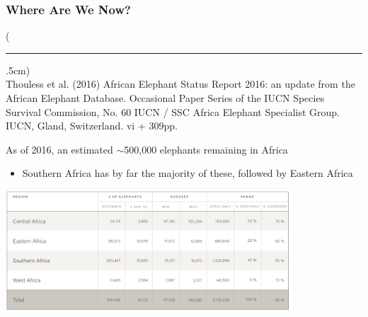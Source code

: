\documentclass[10pt]{beamer}
\newenvironment{reference}[2]{%
	\begin{textblock*}{\textwidth}(#1,#2)
		\tiny\bgroup\color{gray}}{\egroup\end{textblock*}}
\begin{document}
\begin{frame}[t]
\frametitle{Where Are We Now?}
\vspace{0.5cm}

	\begin{reference}{4mm}{88mm}
		\rule{1.5cm}{0.25pt}\\
		Thouless et al. (2016) African Elephant Status Report 2016: an update from the African Elephant Database. Occasional Paper Series of the IUCN Species Survival Commission, No. 60 IUCN / SSC Africa Elephant Specialist Group. IUCN, Gland, Switzerland. vi + 309pp.
	\end{reference}
	
	
	As of 2016, an estimated $\sim$500,000 elephants remaining in Africa\\
		\medskip
		\begin{itemize}
			\item Southern Africa has by far the majority of these, followed by Eastern Africa\\
		\end{itemize}
	
	\vspace{0.25cm}
	
	\begin{center}
		\includegraphics[width=0.8\textwidth]{figures/current_numbers.png}
	\end{center}	
\end{frame}
\end{document}
